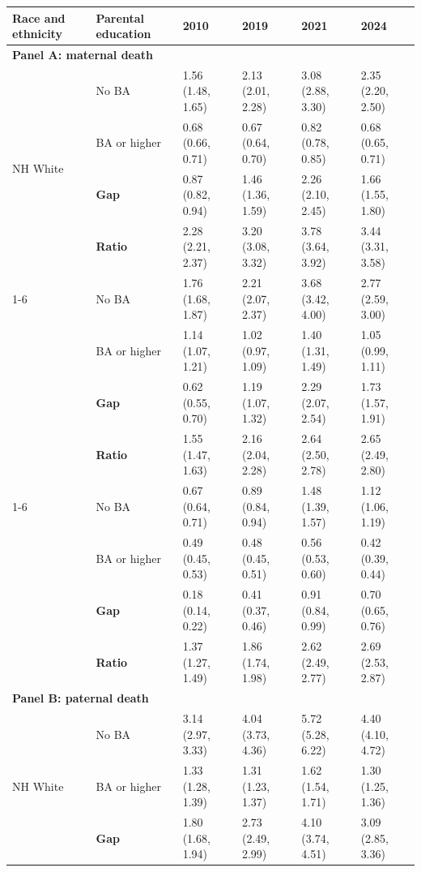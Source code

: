 \begin{threeparttable}
\begin{tabular}{llllll}
\toprule
Race and ethnicity & Parental education & 2010 & 2019 & 2021 & 2024 \\
\midrule
\multicolumn{6}{l}{\textbf{Panel A: maternal death}} \\
\multirow{4}{*}{NH White} & No BA & 1.56 (1.48, 1.65) & 2.13 (2.01, 2.28) & 3.08 (2.88, 3.30) & 2.35 (2.20, 2.50) \\
 & BA or higher & 0.68 (0.66, 0.71) & 0.67 (0.64, 0.70) & 0.82 (0.78, 0.85) & 0.68 (0.65, 0.71) \\
 & \textbf{Gap} & 0.87 (0.82, 0.94) & 1.46 (1.36, 1.59) & 2.26 (2.10, 2.45) & 1.66 (1.55, 1.80) \\
 & \textbf{Ratio} & 2.28 (2.21, 2.37) & 3.20 (3.08, 3.32) & 3.78 (3.64, 3.92) & 3.44 (3.31, 3.58) \\
\cmidrule(lr){1-6}
\multirow{4}{*}{NH Black} & No BA & 1.76 (1.68, 1.87) & 2.21 (2.07, 2.37) & 3.68 (3.42, 4.00) & 2.77 (2.59, 3.00) \\
 & BA or higher & 1.14 (1.07, 1.21) & 1.02 (0.97, 1.09) & 1.40 (1.31, 1.49) & 1.05 (0.99, 1.11) \\
 & \textbf{Gap} & 0.62 (0.55, 0.70) & 1.19 (1.07, 1.32) & 2.29 (2.07, 2.54) & 1.73 (1.57, 1.91) \\
 & \textbf{Ratio} & 1.55 (1.47, 1.63) & 2.16 (2.04, 2.28) & 2.64 (2.50, 2.78) & 2.65 (2.49, 2.80) \\
\cmidrule(lr){1-6}
\multirow{4}{*}{Hispanic} & No BA & 0.67 (0.64, 0.71) & 0.89 (0.84, 0.94) & 1.48 (1.39, 1.57) & 1.12 (1.06, 1.19) \\
 & BA or higher & 0.49 (0.45, 0.53) & 0.48 (0.45, 0.51) & 0.56 (0.53, 0.60) & 0.42 (0.39, 0.44) \\
 & \textbf{Gap} & 0.18 (0.14, 0.22) & 0.41 (0.37, 0.46) & 0.91 (0.84, 0.99) & 0.70 (0.65, 0.76) \\
 & \textbf{Ratio} & 1.37 (1.27, 1.49) & 1.86 (1.74, 1.98) & 2.62 (2.49, 2.77) & 2.69 (2.53, 2.87) \\
\midrule
\multicolumn{6}{l}{\textbf{Panel B: paternal death}} \\
\multirow{4}{*}{NH White} & No BA & 3.14 (2.97, 3.33) & 4.04 (3.73, 4.36) & 5.72 (5.28, 6.22) & 4.40 (4.10, 4.72) \\
 & BA or higher & 1.33 (1.28, 1.39) & 1.31 (1.23, 1.37) & 1.62 (1.54, 1.71) & 1.30 (1.25, 1.36) \\
 & \textbf{Gap} & 1.80 (1.68, 1.94) & 2.73 (2.49, 2.99) & 4.10 (3.74, 4.51) & 3.09 (2.85, 3.36) \\

\end{tabular}
\end{threeparttable}

